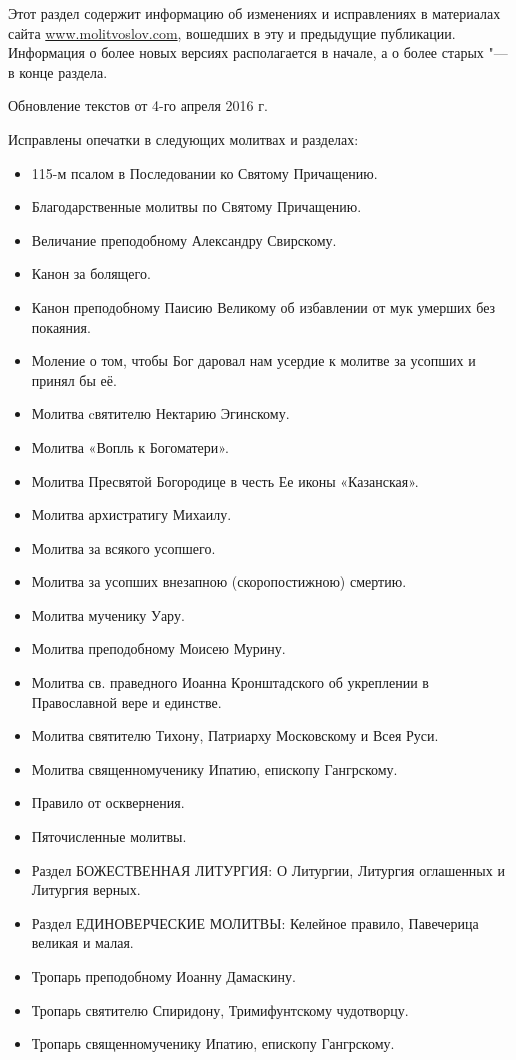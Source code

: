 \renewcommand{\ornament}{uzor_begin_9}

Этот раздел содержит информацию об изменениях и исправлениях в материалах сайта \url{www.molitvoslov.com}, вошедших в эту и предыдущие публикации. Информация о более новых версиях располагается в начале, а о более старых "--- в конце раздела.


Обновление текстов от 4-го апреля 2016 г.

Исправлены опечатки в следующих молитвах и разделах:

\begin{itemize}

\item 115-м псалом в Последовании ко Святому Причащению.
\item Благодарственные молитвы по Святому Причащению.
\item Величание преподобному Александру Свирскому.
\item Канон за болящего.
\item Канон преподобному Паисию Великому об избавлении от мук умерших без покаяния.
\item Моление о том, чтобы Бог даровал нам усердие к молитве за усопших и принял бы её.
\item Молитва cвятителю Нектарию Эгинскому.
\item Молитва «Вопль к Богоматери».
\item Молитва Пресвятой Богородице в честь Ее иконы «Казанская».
\item Молитва архистратигу Михаилу.
\item Молитва за всякого усопшего.
\item Молитва за усопших внезапною (скоропостижною) смертию.
\item Молитва мученику Уару.
\item Молитва преподобному Моисею Мурину.
\item Молитва св. праведного Иоанна Кронштадского об укреплении в Православной вере и единстве.
\item Молитва святителю Тихону, Патриарху Московскому и Всея Руси.
\item Молитва священномученику Ипатию, епископу Гангрскому.
\item Правило от осквернения.
\item Пяточисленные молитвы.
\item Раздел БОЖЕСТВЕННАЯ ЛИТУРГИЯ: О Литургии, Литургия оглашенных и Литургия верных.
\item Раздел ЕДИНОВЕРЧЕСКИЕ МОЛИТВЫ: Келейное правило, Павечерица великая и малая.
\item Тропарь преподобному Иоанну Дамаскину.
\item Тропарь святителю Спиридону, Тримифунтскому чудотворцу.
\item Тропарь священномученику Ипатию, епископу Гангрскому.

\end{itemize}


